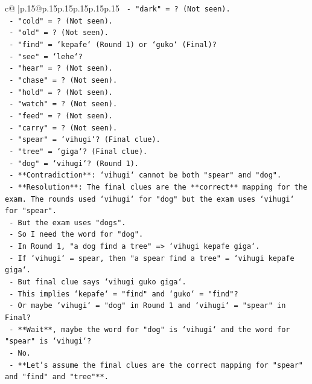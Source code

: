 \documentclass{article}
\begin{document}
{\begin{supertabular}{c@{$\;$}|p{.15\linewidth}@{}p{.15\linewidth}p{.15\linewidth}p{.15\linewidth}p{.15\linewidth}p{.15\linewidth}}
{{{\texttt{  {-} "dark" = ? (Not seen).} \\
\texttt{  {-} "cold" = ? (Not seen).} \\
\texttt{  {-} "old" = ? (Not seen).} \\
\texttt{  {-} "find" = `kepafe` (Round 1) or `guko` (Final)?} \\
\texttt{  {-} "see" = `lehe`?} \\
\texttt{  {-} "hear" = ? (Not seen).} \\
\texttt{  {-} "chase" = ? (Not seen).} \\
\texttt{  {-} "hold" = ? (Not seen).} \\
\texttt{  {-} "watch" = ? (Not seen).} \\
\texttt{  {-} "feed" = ? (Not seen).} \\
\texttt{  {-} "carry" = ? (Not seen).} \\
\texttt{  {-} "spear" = `vihugi`? (Final clue).} \\
\texttt{  {-} "tree" = `giga`? (Final clue).} \\
\texttt{  {-} "dog" = `vihugi`? (Round 1).} \\
\texttt{  {-} **Contradiction**: `vihugi` cannot be both "spear" and "dog".} \\
\texttt{  {-} **Resolution**: The final clues are the **correct** mapping for the exam. The rounds used `vihugi` for "dog" but the exam uses `vihugi` for "spear".} \\
\texttt{  {-} But the exam uses "dogs".} \\
\texttt{  {-} So I need the word for "dog".} \\
\texttt{  {-} In Round 1, "a dog find a tree" => `vihugi kepafe giga`.} \\
\texttt{  {-} If `vihugi` = spear, then "a spear find a tree" = `vihugi kepafe giga`.} \\
\texttt{  {-} But final clue says `vihugi guko giga`.} \\
\texttt{  {-} This implies `kepafe` = "find" and `guko` = "find"?} \\
\texttt{  {-} Or maybe `vihugi` = "dog" in Round 1 and `vihugi` = "spear" in Final?} \\
\texttt{  {-} **Wait**, maybe the word for "dog" is `vihugi` and the word for "spear" is `vihugi`?} \\
\texttt{  {-} No.} \\
\texttt{  {-} **Let's assume the final clues are the correct mapping for "spear" and "find" and "tree"**.} \\
}}}
\end{supertabular}}
\end{document}
